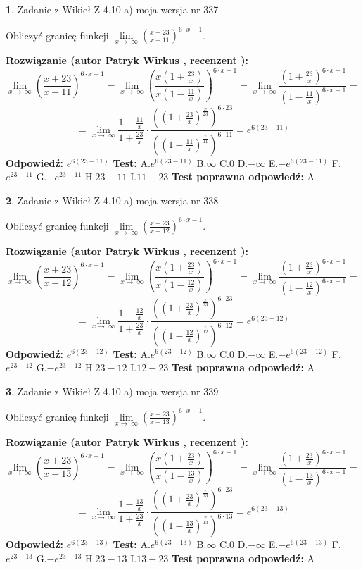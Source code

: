 \documentclass[12pt, a4paper]{article}
\theoremstyle{definition} %
\newtheorem{zad}{}
\newcommand{\zadStart}[1]{\begin{zad}#1\newline}
\newcommand{\zadStop}{\end{zad}}
\newcommand{\rozwStart}[2]{\noindent \textbf{Rozwiązanie (autor #1 , recenzent #2): }\newline}
\newcommand{\rozwStop}{\newline}
\newcommand{\odpStart}{\noindent \textbf{Odpowiedź:}\newline}
\newcommand{\odpStop}{\newline}
\newcommand{\testStart}{\noindent \textbf{Test:}\newline}
\newcommand{\testStop}{\newline}
\newcommand{\kluczStart}{\noindent \textbf{Test poprawna odpowiedź:}\newline}
\newcommand{\kluczStop}{\newline}
\begin{document}
\zadStart{Zadanie z Wikieł Z 4.10 a) moja wersja nr 337}


Obliczyć granicę funkcji  $\lim\limits_{x\to\ \infty}(\frac{x+23}{x-11})^{6\cdot x-1}$.
\zadStop
\rozwStart{Patryk Wirkus}{}
$$\lim\limits_{x\to\ \infty}(\frac{x+23}{x-11})^{6\cdot x-1} = \lim\limits_{x\to\ \infty}(\frac{x(1+\frac{23}{x})}{x(1-\frac{11}{x})})^{6\cdot x-1}=\lim\limits_{x\to\ \infty}\frac{(1+\frac{23}{x})^{6\cdot x-1}}{(1-\frac{11}{x})^{6\cdot x-1}}=$$
$$=\lim\limits_{x\to\ \infty}\frac{1-\frac{11}{x}}{1+\frac{23}{x}}\cdot\frac{((1+\frac{23}{x})^{\frac{x}{23}})^{6\cdot23}}{((1-\frac{11}{x})^{\frac{x}{11}})^{6\cdot11}}=e^{6(23-11)}$$
\rozwStop
\odpStart
$e^{6(23-11)}$
\odpStop
\testStart
A.$e^{6(23-11)}$ B.$\infty$ C.$0$ D.$-\infty$ E.$-e^{6(23-11)}$
F.$e^{23-11}$ G.$-e^{23-11}$
H.$23-11$
I.$11-23$
\testStop
\kluczStart
A
\kluczStop



\zadStart{Zadanie z Wikieł Z 4.10 a) moja wersja nr 338}


Obliczyć granicę funkcji  $\lim\limits_{x\to\ \infty}(\frac{x+23}{x-12})^{6\cdot x-1}$.
\zadStop
\rozwStart{Patryk Wirkus}{}
$$\lim\limits_{x\to\ \infty}(\frac{x+23}{x-12})^{6\cdot x-1} = \lim\limits_{x\to\ \infty}(\frac{x(1+\frac{23}{x})}{x(1-\frac{12}{x})})^{6\cdot x-1}=\lim\limits_{x\to\ \infty}\frac{(1+\frac{23}{x})^{6\cdot x-1}}{(1-\frac{12}{x})^{6\cdot x-1}}=$$
$$=\lim\limits_{x\to\ \infty}\frac{1-\frac{12}{x}}{1+\frac{23}{x}}\cdot\frac{((1+\frac{23}{x})^{\frac{x}{23}})^{6\cdot23}}{((1-\frac{12}{x})^{\frac{x}{12}})^{6\cdot12}}=e^{6(23-12)}$$
\rozwStop
\odpStart
$e^{6(23-12)}$
\odpStop
\testStart
A.$e^{6(23-12)}$ B.$\infty$ C.$0$ D.$-\infty$ E.$-e^{6(23-12)}$
F.$e^{23-12}$ G.$-e^{23-12}$
H.$23-12$
I.$12-23$
\testStop
\kluczStart
A
\kluczStop



\zadStart{Zadanie z Wikieł Z 4.10 a) moja wersja nr 339}


Obliczyć granicę funkcji  $\lim\limits_{x\to\ \infty}(\frac{x+23}{x-13})^{6\cdot x-1}$.
\zadStop
\rozwStart{Patryk Wirkus}{}
$$\lim\limits_{x\to\ \infty}(\frac{x+23}{x-13})^{6\cdot x-1} = \lim\limits_{x\to\ \infty}(\frac{x(1+\frac{23}{x})}{x(1-\frac{13}{x})})^{6\cdot x-1}=\lim\limits_{x\to\ \infty}\frac{(1+\frac{23}{x})^{6\cdot x-1}}{(1-\frac{13}{x})^{6\cdot x-1}}=$$
$$=\lim\limits_{x\to\ \infty}\frac{1-\frac{13}{x}}{1+\frac{23}{x}}\cdot\frac{((1+\frac{23}{x})^{\frac{x}{23}})^{6\cdot23}}{((1-\frac{13}{x})^{\frac{x}{13}})^{6\cdot13}}=e^{6(23-13)}$$
\rozwStop
\odpStart
$e^{6(23-13)}$
\odpStop
\testStart
A.$e^{6(23-13)}$ B.$\infty$ C.$0$ D.$-\infty$ E.$-e^{6(23-13)}$
F.$e^{23-13}$ G.$-e^{23-13}$
H.$23-13$
I.$13-23$
\testStop
\kluczStart
A
\kluczStop
\end{document}
